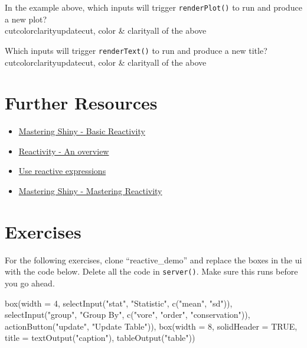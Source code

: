 \documentclass[
  oneside]{book}
\newenvironment{Shaded}{\begin{snugshade}}{\end{snugshade}}
\newcommand{\AttributeTok}[1]{\textcolor[rgb]{0.77,0.63,0.00}{#1}}
\newcommand{\ConstantTok}[1]{\textcolor[rgb]{0.00,0.00,0.00}{#1}}
\newcommand{\DecValTok}[1]{\textcolor[rgb]{0.00,0.00,0.81}{#1}}
\newcommand{\FunctionTok}[1]{\textcolor[rgb]{0.00,0.00,0.00}{#1}}
\newcommand{\NormalTok}[1]{#1}
\newcommand{\StringTok}[1]{\textcolor[rgb]{0.31,0.60,0.02}{#1}}
\providecommand{\tightlist}{%
  \setlength{\itemsep}{0pt}\setlength{\parskip}{0pt}}
\begin{document}
In the example above, which inputs will trigger \texttt{renderPlot}\texttt{()} to run and produce a new plot?\\
cutcolorclarityupdatecut, color \& clarityall of the above

Which inputs will trigger \texttt{renderText}\texttt{()} to run and produce a new title?\\
cutcolorclarityupdatecut, color \& clarityall of the above

\hypertarget{resources-reactive}{%
\section{Further Resources}\label{resources-reactive}}

\begin{itemize}
\tightlist
\item
  \href{https://mastering-shiny.org/basic-reactivity.html}{Mastering Shiny - Basic Reactivity}
\item
  \href{https://shiny.rstudio.com/articles/reactivity-overview.html}{Reactivity - An overview}
\item
  \href{https://shiny.rstudio.com/tutorial/written-tutorial/lesson6/}{Use reactive expressions}
\item
  \href{https://mastering-shiny.org/reactivity-intro.html}{Mastering Shiny - Mastering Reactivity}
\end{itemize}

\hypertarget{exercises-reactive}{%
\section{Exercises}\label{exercises-reactive}}

For the following exercises, clone ``reactive\_demo'' and replace the boxes in the ui with the code below. Delete all the code in \texttt{server}\texttt{()}. Make sure this runs before you go ahead.

\begin{Shaded}
\begin{Highlighting}[]
\FunctionTok{box}\NormalTok{(}\AttributeTok{width =} \DecValTok{4}\NormalTok{,}
    \FunctionTok{selectInput}\NormalTok{(}\StringTok{"stat"}\NormalTok{, }\StringTok{"Statistic"}\NormalTok{, }\FunctionTok{c}\NormalTok{(}\StringTok{"mean"}\NormalTok{, }\StringTok{"sd"}\NormalTok{)),}
    \FunctionTok{selectInput}\NormalTok{(}\StringTok{"group"}\NormalTok{, }\StringTok{"Group By"}\NormalTok{, }\FunctionTok{c}\NormalTok{(}\StringTok{"vore"}\NormalTok{, }\StringTok{"order"}\NormalTok{, }\StringTok{"conservation"}\NormalTok{)),}
    \FunctionTok{actionButton}\NormalTok{(}\StringTok{"update"}\NormalTok{, }\StringTok{"Update Table"}\NormalTok{)),}
\FunctionTok{box}\NormalTok{(}\AttributeTok{width =} \DecValTok{8}\NormalTok{,}
    \AttributeTok{solidHeader =} \ConstantTok{TRUE}\NormalTok{,}
    \AttributeTok{title =} \FunctionTok{textOutput}\NormalTok{(}\StringTok{"caption"}\NormalTok{),}
    \FunctionTok{tableOutput}\NormalTok{(}\StringTok{"table"}\NormalTok{))}
\end{Highlighting}
\end{Shaded}
\end{document}
